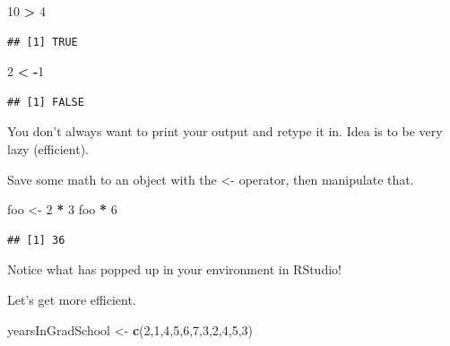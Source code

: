 \documentclass[]{book}
\newenvironment{Shaded}{\begin{snugshade}}{\end{snugshade}}
\newcommand{\KeywordTok}[1]{\textcolor[rgb]{0.13,0.29,0.53}{\textbf{#1}}}
\newcommand{\DecValTok}[1]{\textcolor[rgb]{0.00,0.00,0.81}{#1}}
\newcommand{\StringTok}[1]{\textcolor[rgb]{0.31,0.60,0.02}{#1}}
\newcommand{\OperatorTok}[1]{\textcolor[rgb]{0.81,0.36,0.00}{\textbf{#1}}}
\newcommand{\NormalTok}[1]{#1}
\theoremstyle{definition}
\theoremstyle{definition}
\theoremstyle{definition}
\theoremstyle{remark}
\begin{document}
\begin{Shaded}
\begin{Highlighting}[]
\DecValTok{10} \OperatorTok{>}\StringTok{ }\DecValTok{4}
\end{Highlighting}
\end{Shaded}

\begin{verbatim}
## [1] TRUE
\end{verbatim}

\begin{Shaded}
\begin{Highlighting}[]
\DecValTok{2} \OperatorTok{<}\StringTok{ }\OperatorTok{-}\DecValTok{1}
\end{Highlighting}
\end{Shaded}

\begin{verbatim}
## [1] FALSE
\end{verbatim}

You don't always want to print your output and retype it in. Idea is to
be very lazy (efficient).

Save some math to an object with the \textless{}- operator, then
manipulate that.

\begin{Shaded}
\begin{Highlighting}[]
\NormalTok{foo <-}\StringTok{ }\DecValTok{2} \OperatorTok{*}\StringTok{ }\DecValTok{3}
\NormalTok{foo }\OperatorTok{*}\StringTok{ }\DecValTok{6}
\end{Highlighting}
\end{Shaded}

\begin{verbatim}
## [1] 36
\end{verbatim}

Notice what has popped up in your environment in RStudio!

Let's get more efficient.

\begin{Shaded}
\begin{Highlighting}[]
\NormalTok{yearsInGradSchool <-}\StringTok{ }\KeywordTok{c}\NormalTok{(}\DecValTok{2}\NormalTok{,}\DecValTok{1}\NormalTok{,}\DecValTok{4}\NormalTok{,}\DecValTok{5}\NormalTok{,}\DecValTok{6}\NormalTok{,}\DecValTok{7}\NormalTok{,}\DecValTok{3}\NormalTok{,}\DecValTok{2}\NormalTok{,}\DecValTok{4}\NormalTok{,}\DecValTok{5}\NormalTok{,}\DecValTok{3}\NormalTok{)}
\end{Highlighting}
\end{Shaded}
\end{document}
